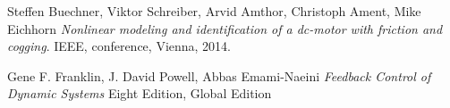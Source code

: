 \begin{thebibliography}{9}
Steffen Buechner, Viktor Schreiber, Arvid Amthor, Christoph Ament, Mike Eichhorn
\textit{Nonlinear modeling and identification of a dc-motor with friction and cogging}. 
IEEE, conference, Vienna, 2014.

Gene F. Franklin, J. David Powell, Abbas Emami-Naeini
\textit{Feedback Control of Dynamic Systems}
Eight Edition, Global Edition
\end{thebibliography}